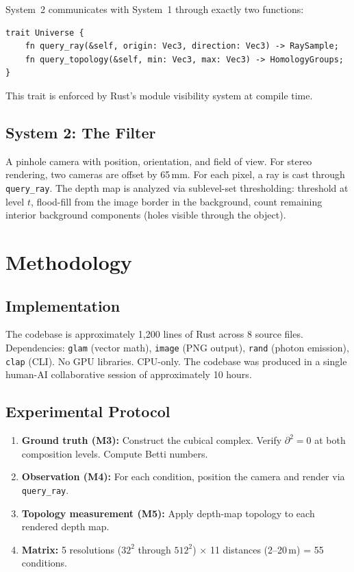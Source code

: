 \documentclass[11pt,a4paper]{article}
\theoremstyle{remark}
\begin{document}
System~2 communicates with System~1 through exactly two functions:

\begin{lstlisting}[caption={The Universe trait --- the sole interface between System 1 and System 2.}, label={lst:api}]
trait Universe {
    fn query_ray(&self, origin: Vec3, direction: Vec3) -> RaySample;
    fn query_topology(&self, min: Vec3, max: Vec3) -> HomologyGroups;
}
\end{lstlisting}

This trait is enforced by Rust's module visibility system at compile time.

\subsection{System 2: The Filter}

A pinhole camera with position, orientation, and field of view. For stereo rendering, two cameras are offset by 65\,mm. For each pixel, a ray is cast through \texttt{query\_ray}. The depth map is analyzed via sublevel-set thresholding: threshold at level $t$, flood-fill from the image border in the background, count remaining interior background components (holes visible through the object).

\section{Methodology}
\label{sec:method}

\subsection{Implementation}

The codebase is approximately 1,200 lines of Rust across 8 source files. Dependencies: \texttt{glam} (vector math), \texttt{image} (PNG output), \texttt{rand} (photon emission), \texttt{clap} (CLI). No GPU libraries. CPU-only. The codebase was produced in a single human-AI collaborative session of approximately 10 hours.

\subsection{Experimental Protocol}

\begin{enumerate}[leftmargin=*]
    \item \textbf{Ground truth (M3):} Construct the cubical complex. Verify $\partial^2 = 0$ at both composition levels. Compute Betti numbers.
    \item \textbf{Observation (M4):} For each condition, position the camera and render via \texttt{query\_ray}.
    \item \textbf{Topology measurement (M5):} Apply depth-map topology to each rendered depth map.
    \item \textbf{Matrix:} 5 resolutions ($32^2$ through $512^2$) $\times$ 11 distances (2--20\,m) = 55 conditions.
\end{enumerate}
\end{document}
